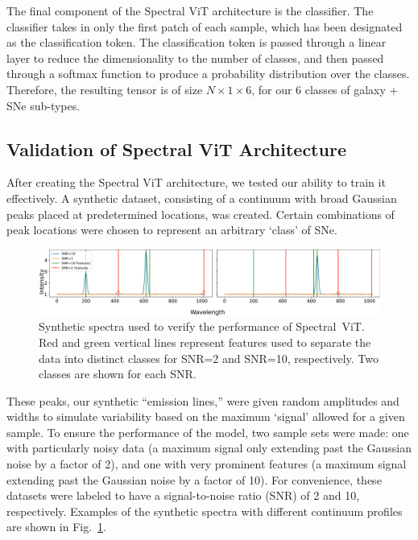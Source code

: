 The final component of the Spectral ViT architecture is the classifier. The classifier
takes in only the first patch of each sample, which has been designated as the classification token.
The classification token is passed through a linear layer to reduce the dimensionality to the
number of classes, and then passed through a softmax function to produce a probability distribution
over the classes. Therefore, the resulting tensor is of size $N \times 1 \times 6$, for our 
6 classes of galaxy + SNe sub-types.

\subsection{Validation of Spectral ViT Architecture}
\label{ssec:validation}
After creating the Spectral ViT architecture, we tested our  ability to train it 
effectively. A synthetic dataset, consisting of a continuum with 
broad Gaussian peaks placed at predetermined locations, was created. Certain combinations of 
peak locations were chosen to represent an arbitrary `class' of SNe. 
\begin{figure}[t]
    \centering
    \includegraphics[width=\textwidth]{figures/synth_data_new.png}
    \caption[Synthetic spectra]{Synthetic spectra used to verify the performance of Spectral~ViT. Red and green vertical lines represent features used to 
    separate the data into distinct classes for SNR=2 and SNR=10, respectively. Two classes are shown for each SNR.}
    \label{fig:synth_spectra}
\end{figure}
These peaks, 
our synthetic ``emission lines,'' were given random amplitudes and widths to simulate 
variability based on the maximum `signal' allowed for a given sample. 
To ensure the performance of the model, two sample sets were made: one with particularly noisy data 
(a maximum signal only extending past the Gaussian noise by a factor of 2), and one with 
very prominent features (a maximum signal extending past the Gaussian noise by a factor of 10). For 
convenience, these datasets were labeled to have a signal-to-noise ratio (SNR) of 2 and 10, respectively. 
Examples of the synthetic spectra with different continuum profiles are shown in Fig.~\ref{fig:synth_spectra}. 

